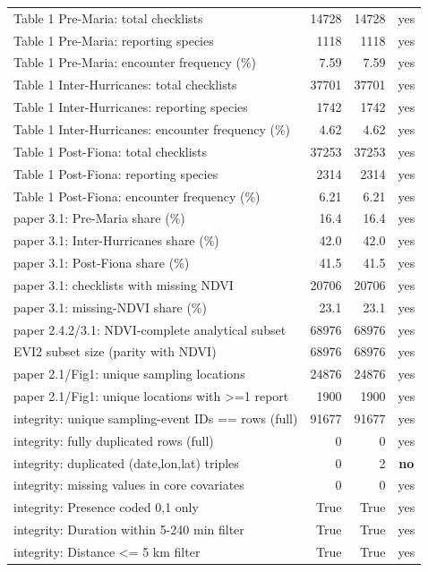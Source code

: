 \begin{longtable}{p{7.4cm}rrc}
Table 1 Pre-Maria: total checklists & 14728 & 14728 & yes \\
Table 1 Pre-Maria: reporting species & 1118 & 1118 & yes \\
Table 1 Pre-Maria: encounter frequency (\%) & 7.59 & 7.59 & yes \\
Table 1 Inter-Hurricanes: total checklists & 37701 & 37701 & yes \\
Table 1 Inter-Hurricanes: reporting species & 1742 & 1742 & yes \\
Table 1 Inter-Hurricanes: encounter frequency (\%) & 4.62 & 4.62 & yes \\
Table 1 Post-Fiona: total checklists & 37253 & 37253 & yes \\
Table 1 Post-Fiona: reporting species & 2314 & 2314 & yes \\
Table 1 Post-Fiona: encounter frequency (\%) & 6.21 & 6.21 & yes \\
paper 3.1: Pre-Maria share (\%) & 16.4 & 16.4 & yes \\
paper 3.1: Inter-Hurricanes share (\%) & 42.0 & 42.0 & yes \\
paper 3.1: Post-Fiona share (\%) & 41.5 & 41.5 & yes \\
paper 3.1: checklists with missing NDVI & 20706 & 20706 & yes \\
paper 3.1: missing-NDVI share (\%) & 23.1 & 23.1 & yes \\
paper 2.4.2/3.1: NDVI-complete analytical subset & 68976 & 68976 & yes \\
EVI2 subset size (parity with NDVI) & 68976 & 68976 & yes \\
paper 2.1/Fig1: unique sampling locations & 24876 & 24876 & yes \\
paper 2.1/Fig1: unique locations with >=1 report & 1900 & 1900 & yes \\
integrity: unique sampling-event IDs == rows (full) & 91677 & 91677 & yes \\
integrity: fully duplicated rows (full) & 0 & 0 & yes \\
integrity: duplicated (date,lon,lat) triples & 0 & 2 & \textbf{no} \\
integrity: missing values in core covariates & 0 & 0 & yes \\
integrity: Presence coded {0,1} only & True & True & yes \\
integrity: Duration within 5-240 min filter & True & True & yes \\
integrity: Distance <= 5 km filter & True & True & yes \\

\end{longtable}

